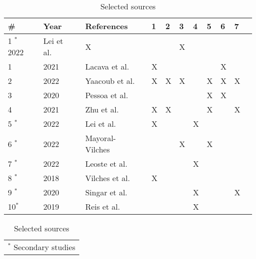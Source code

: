 \begin{table}[h]
\centering

\caption{Selected sources}
\label{table:selected_sources}
\begin{tabularx}{\textwidth}{|l|X|l|l|l|l|l|l|l|l|l|}
\hline
\textbf{\#}  & \textbf{Year} & \textbf{References}                                              & \textbf{1} & \textbf{2} & \textbf{3} & \textbf{4} & \textbf{5}& \textbf{6}& \textbf{7}  \\\hline
1 $^{\ast}$ 2022 & Lei et al.~\cite[]{acceptance_telepresence_robots_2022} & X &  &  & X &  &  &  \\\hline

1            & 2021          & Lacava et al.~\cite[]{cyber_security_issues_in_robotics_2021}    & X          &            &            &            &            & X          &            \\\hline
2            & 2022          & Yaacoub et al.~\cite[]{robotics_cyber_security_2022}             & X          & X          & X          &            & X          & X          & X          \\\hline
3            & 2020          & Pessoa et al.~\cite[]{smart_design_engineering_2020}             &            &            &            &            & X          & X          &            \\\hline
4            & 2021          & Zhu et al.~\cite[]{introduction_to_robot_system_security_2021}   & X          & X          &            &            & X          &           & X         \\\hline
5 $^{\ast}$  & 2022 & Lei et al. ~\cite[]{acceptance_telepresence_robots_2022} & X &  &  & X &  &  &  \\\hline
6 $^{\ast}$  & 2022          & Mayoral-Vilches~\cite[]{robot_security_review_2022}              &            &            & X          &            & X          &            &            \\\hline
7 $^{\ast}$  & 2022          & Leoste et al.~\cite[]{higher_edu_perception_on_tprs_2022}        &            &            &            & X         &            &            &               \\\hline
8 $^{\ast}$  & 2018          & Vilches et al.~\cite[]{robot_security_framework_2018}            & X          &            &            &            &            &            &            \\\hline
9 $^{\ast}$  & 2020          & Singar et al.~\cite[]{role_of_cyber_security_in_higher_edu_2020} &           &            &            & X         &            &            & X         \\\hline
10$^{\ast}$  & 2019          & Reis et al.~\cite[]{telepresence_robots_in_classroom_2019}       &            &            &            & X         &            &            &               \\\hline
\end{tabularx}
\begin{tabularx}{\textwidth}{@{}l}
\footnotesize{$^{\ast}$ Secondary studies}\\
\end{tabularx}
\end{table}

